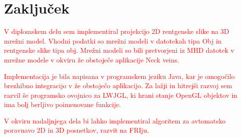 \documentclass[a4paper, 12pt]{book}
\begin{document}
\chapter{Zaključek}
\textcolor{red}{V diplomskem delu sem implementiral projekcijo 2D rentgenske slike na 3D mrežni model. Vhodni podatki so mrežni modeli v datotekah tipa Obj in rentgenske slike tipa obj. Mrežni modeli so bili pretvorjeni iz MHD datotek v mrežne modele v okviru že obstoječe aplikacije Neck veins.
}

\textcolor{red}{Implementacija je bila napisana v programskem jeziku Java, kar je omogočilo brezhibno integracijo v že obstoječo aplikacijo. Za lažji in hitrejši razvoj sem razvil še programsko ovojnico za LWJGL, ki hrani stanje OpenGL objektov in ima bolj berljivo poimenovane funkcije.}

\textcolor{red}{V okviru nadaljnjega dela bi lahko implementiral algoritem za avtomatsko poravnavo 2D in 3D posnetkov\cite{6507588}, razvit na FRIju.}



\end{document}
